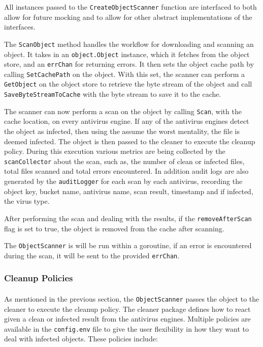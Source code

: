 \documentclass[12pt, conference, final, a4paper, onecolumn, compsoc]{IEEEtran}
\begin{document}
All instances passed to the \texttt{CreateObjectScanner} function are interfaced
to both allow for future mocking and to allow for other abstract implementations
of the interfaces.

The \texttt{ScanObject} method handles the workflow for downloading and scanning
an object. It takes in an \texttt{object.Object} instance, which it fetches from
the object store, and an \texttt{errChan} for returning errors. It then sets the
object cache path by calling \texttt{SetCachePath} on the object. With this set,
the scanner can perform a \texttt{GetObject} on the object store to retrieve the
byte stream of the object and call \texttt{SaveByteStreamToCache} with the byte
stream to save it to the cache.

The scanner can now perform a scan on the object by calling \texttt{Scan}, with
the cache location, on every antivirus engine. If any of the antivirus engines
detect the object as infected, then using the assume the worst mentality, the
file is deemed infected. The object is then passed to the cleaner to execute the
cleanup policy. During this execution various metrics are being collected by the
\texttt{scanCollector} about the scan, such as, the number of clean or infected
files, total files scanned and total errors encountered. In addition audit logs
are also generated by the \texttt{auditLogger} for each scan by each antivirus,
recording the object key, bucket name, antivirus name, scan result, timestamp
and if infected, the virus type.

After performing the scan and dealing with the results, if the
\texttt{removeAfterScan} flag is set to true, the object is removed from the
cache after scanning.

The \texttt{ObjectScanner} is will be run within a goroutine, if an error is
encountered during the scan, it will be sent to the provided \texttt{errChan}.

\subsubsection*{Cleanup Policies}
\paragraph{}


As mentioned in the previous section, the \texttt{ObjectScanner} passes the
object to the cleaner to execute the cleanup policy. The cleaner package defines
how to react given a clean or infected result from the antivirus engines.
Multiple policies are available in the \texttt{config.env} file to give the user
flexibility in how they want to deal with infected objects. These policies
include:
\end{document}
